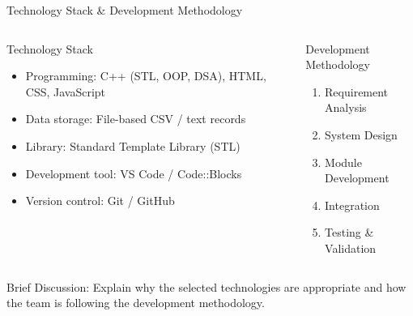 \documentclass[aspectratio=169,11pt]{beamer}
\newcommand{\smallnote}[1]{%
\vspace{0.08cm}
{\scriptsize\color{GEUGrey}#1}
}
\begin{document}
\begin{frame}{Technology Stack \& Development Methodology}

\begin{columns}[T,totalwidth=\textwidth]


\begin{block}{Technology Stack}

\begin{itemize}\itemsep2pt
\item Programming: C++ (STL, OOP, DSA), HTML, CSS, JavaScript
\item Data storage: File-based CSV / text records
\item Library: Standard Template Library (STL)
\item Development tool: VS Code / Code::Blocks
\item Version control: Git / GitHub
\end{itemize}

\end{block}


\begin{block}{Development Methodology}

\begin{enumerate}\itemsep2pt
\item Requirement Analysis
\item System Design
\item Module Development
\item Integration
\item Testing \& Validation
\end{enumerate}

\end{block}

\end{columns}

\vfill

\smallnote{
Brief Discussion: Explain why the selected technologies are appropriate
and how the team is following the development methodology.
}

\end{frame}
\end{document}
